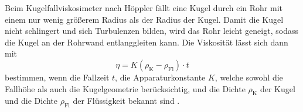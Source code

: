 Beim Kugelfallviskosimeter nach Höppler fällt eine Kugel durch ein Rohr mit einem
nur wenig größerem Radius als der Radius der Kugel. Damit die Kugel nicht
schlingert und sich Turbulenzen bilden, wird das Rohr leicht geneigt, sodass die
Kugel an der Rohrwand entlanggleiten kann. Die Viskosität lässt sich dann mit
\begin{equation}
  \eta = K (\rho_\text{K} - \rho_\text{Fl}) \cdot t
  \label{eqn:bestimmung_eta}
\end{equation}
bestimmen, wenn die Fallzeit $t$, die Apparaturkonstante $K$, welche sowohl die
Fallhöhe als auch die Kugelgeometrie berücksichtig, und die Dichte $\rho_\text{K}$
der Kugel und die Dichte $\rho_\text{Fl}$ der Flüssigkeit bekannt sind
\cite{sample}.
